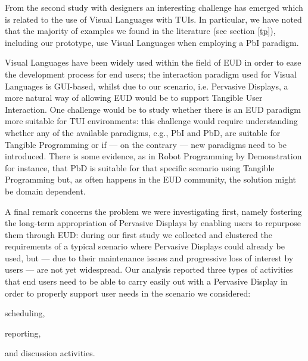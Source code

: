 From the second study with designers an interesting challenge has emerged which is related to the use of Visual Languages with \acp{TUI}. In particular, we have noted that the majority of examples we found in the literature (see section \ref{tp}), including our prototype, use Visual Languages when employing a \ac{PbI} paradigm. 

Visual Languages have been widely used within the field of \ac{EUD} in order to ease the development process for end users; the interaction paradigm used for Visual Languages is \ac{GUI}-based, whilst due to our scenario, i.e. Pervasive Displays, a more natural way of allowing \ac{EUD} would be to support Tangible User Interaction. One challenge would be to study whether there is an \ac{EUD} paradigm more suitable for \ac{TUI} environments: this challenge would require understanding whether any of the available paradigms, e.g., \ac{PbI} and \ac{PbD}, are suitable for Tangible Programming or if --- on the contrary --- new paradigms need to be introduced. There is some evidence, as in Robot Programming by Demonstration for instance, that \ac{PbD} is suitable for that specific scenario using Tangible Programming but, as often happens in the \ac{EUD} community, the solution might be domain dependent.

A final remark concerns the problem we were investigating first, namely fostering the long-term appropriation of Pervasive Displays by enabling users to repurpose them through \ac{EUD}: during our first study we collected and clustered the requirements of a typical scenario where Pervasive Displays could already be used, but --- due to their maintenance issues and progressive loss of interest by users --- are not yet widespread. Our analysis reported three types of activities that end users need to be able to carry easily out with a Pervasive Display in order to properly support user needs in the scenario we considered:
\begin{enumerate*}[label=(\arabic*)]
  \item scheduling,
  \item reporting,
  \item and discussion activities.
\end{enumerate*}

